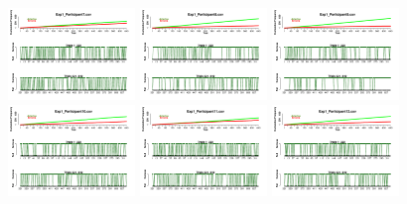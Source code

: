 \begin{figure}[th]
\includegraphics[width=0.30\textwidth]{Figures/Success_Exp1_P7} \includegraphics[width=0.30\textwidth]{Figures/Success_Exp1_P8} \includegraphics[width=0.30\textwidth]{Figures/Success_Exp1_P9}
\includegraphics[width=0.30\textwidth]{Figures/Success_Exp1_P10} \includegraphics[width=0.30\textwidth]{Figures/Success_Exp1_P11} \includegraphics[width=0.30\textwidth]{Figures/Success_Exp1_P12}

\end{figure}
